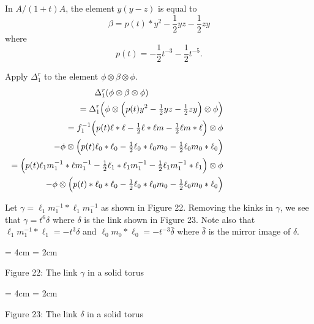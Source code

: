 \documentclass{slides}
\newcommand{\ot}{\otimes}
\theoremstyle{definition}
\begin{document}
\begin{slide}
In $A / (1+t) A$, the element $y(y-z)$ is equal to
$$\beta = p(t)*y^2 - \frac{1}{2} yz - \frac{1}{2} zy$$
where $$p(t) = - \frac{1}{2} t^{-3} - \frac{1}{2} t^{-5}.$$

Apply $\Delta^r_1$ to the element $\phi \ot \beta \ot \phi$.
\begin{eqnarray}
\Delta^r_1 ( \phi \ot \beta \ot \phi) \nonumber \\
& & \hspace{-6cm} =
\Delta^r_1 \Big( \phi \ot \Big( p(t) y^2 - {\textstyle \frac{1}{2}} yz - {\textstyle \frac{1}{2}} zy \Big) \ot \phi \Big) \nonumber \\
& & \hspace{-6cm} =  f_1^{-1} \Big( p(t) \ell*\ell - {\textstyle \frac{1}{2}} \ell * \ell m - {\textstyle \frac{1}{2}} \ell m * \ell \Big) \ot \phi \nonumber \\
& & \hspace{-5cm} - \phi \ot \Big( p(t) \ell_0 * \ell_0 - {\textstyle \frac{1}{2}} \ell_0 * \ell_0 m_0 - {\textstyle \frac{1}{2}} \ell_0 m_0 * \ell_0 \Big) \nonumber \\
& & \hspace{-6cm} = \Big( p(t) \ell_1 m_1^{-1} * \ell m_1^{-1} - {\textstyle \frac{1}{2}} \ell_1 * \ell_1 m_1^{-1}
- {\textstyle \frac{1}{2}} \ell_1 m_1^{-1} * \ell_1 \Big) \ot \phi \nonumber \\
& & \hspace{-5cm} - \phi \ot \Big( p(t)*\ell_0 * \ell_0 - {\textstyle \frac{1}{2}} \ell_0 * \ell_0 m_0 - {\textstyle \frac{1}{2}} \ell_0 m_0 * \ell_0 \Big) \nonumber
\end{eqnarray}
\end{slide}

\begin{slide}
Let $\gamma = \ell_1 m_1^{-1} * \ell_1 m_1^{-1}$ as shown in Figure 22.
Removing the kinks in $\gamma$, we see that $\gamma = t^6 \delta$ where $\delta$
is the link shown in Figure 23.  Note also that $\ell_1 m_1^{-1} * \ell_1 = -t^3 \delta$
and $\ell_0 m_0 * \ell_0 = -t^{-3} \bar{\delta}$ where $\bar{\delta}$ is the mirror image of
$\delta$.

  \begin{center}
    \epsfxsize = 4cm
    \epsfysize = 2cm

Figure 22:  The link $\gamma$ in a solid torus
  \end{center}

\vspace{2cm}

  \begin{center}
    \epsfxsize = 4cm
    \epsfysize = 2cm

Figure 23:  The link $\delta$ in a solid torus
  \end{center}
\end{slide}
\end{document}
